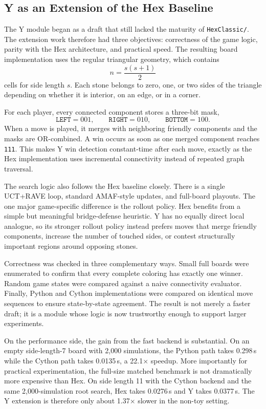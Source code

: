 \documentclass[11pt,a4paper]{article}
\begin{document}
\subsection{Y as an Extension of the Hex Baseline}

The Y module began as a draft that still lacked the maturity of
\texttt{HexClassic/}. The extension work therefore had three objectives:
correctness of the game logic, parity with the Hex architecture, and practical
speed. The resulting board implementation uses the regular triangular geometry,
which contains
\[
n=\frac{s(s+1)}{2}
\]
cells for side length $s$. Each stone belongs to zero, one, or two sides of the
triangle depending on whether it is interior, on an edge, or in a corner.

For each player, every connected component stores a three-bit mask,
\[
\texttt{LEFT}=001,\qquad
\texttt{RIGHT}=010,\qquad
\texttt{BOTTOM}=100.
\]
When a move is played, it merges with neighboring friendly components and the
masks are OR-combined. A win occurs as soon as one merged component reaches
\texttt{111}. This makes Y win detection constant-time after each move, exactly
as the Hex implementation uses incremental connectivity instead of repeated
graph traversal.

The search logic also follows the Hex baseline closely. There is a single
UCT+RAVE loop, standard AMAF-style updates, and full-board playouts. The one
major game-specific difference is the rollout policy. Hex benefits from a
simple but meaningful bridge-defense heuristic. Y has no equally direct local
analogue, so its stronger rollout policy instead prefers moves that merge
friendly components, increase the number of touched sides, or contest
structurally important regions around opposing stones.

Correctness was checked in three complementary ways. Small full boards were
enumerated to confirm that every complete coloring has exactly one winner.
Random game states were compared against a naive connectivity evaluator.
Finally, Python and Cython implementations were compared on identical move
sequences to ensure state-by-state agreement. The result is not merely a faster
draft; it is a module whose logic is now trustworthy enough to support larger
experiments.

On the performance side, the gain from the fast backend is substantial. On an
empty side-length-7 board with 2{,}000 simulations, the Python path takes
0.298\,s while the Cython path takes 0.0135\,s, a 22.1$\times$ speedup. More
importantly for practical experimentation, the full-size matched benchmark is
not dramatically more expensive than Hex. On side length 11 with the Cython
backend and the same 2{,}000-simulation root search, Hex takes 0.0276\,s and Y
takes 0.0377\,s. The Y extension is therefore only about 1.37$\times$ slower in
the non-toy setting.
\end{document}
